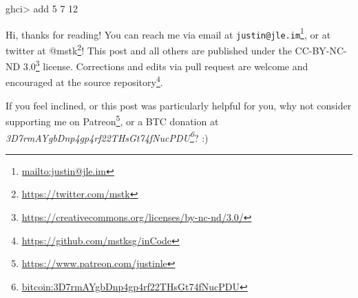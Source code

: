\documentclass[]{article}
\newenvironment{Shaded}{}{}
\newcommand{\DecValTok}[1]{\textcolor[rgb]{0.25,0.63,0.44}{#1}}
\newcommand{\FunctionTok}[1]{\textcolor[rgb]{0.02,0.16,0.49}{#1}}
\newcommand{\NormalTok}[1]{#1}
\renewcommand{\href}[2]{#2\footnote{\url{#1}}}
\begin{document}
\begin{Shaded}
\begin{Highlighting}[]
\NormalTok{ghci}\FunctionTok{>}\NormalTok{ add }\DecValTok{5} \DecValTok{7}
\DecValTok{12}
\end{Highlighting}
\end{Shaded}

Hi, thanks for reading! You can reach me via email at
\href{mailto:justin@jle.im}{\nolinkurl{justin@jle.im}}, or at twitter at
\href{https://twitter.com/mstk}{@mstk}! This post and all others are published
under the \href{https://creativecommons.org/licenses/by-nc-nd/3.0/}{CC-BY-NC-ND
3.0} license. Corrections and edits via pull request are welcome and encouraged
at \href{https://github.com/mstksg/inCode}{the source repository}.

If you feel inclined, or this post was particularly helpful for you, why not
consider \href{https://www.patreon.com/justinle}{supporting me on Patreon}, or a
BTC donation at
\emph{\href{bitcoin:3D7rmAYgbDnp4gp4rf22THsGt74fNucPDU}{3D7rmAYgbDnp4gp4rf22THsGt74fNucPDU}}?
:)
\end{document}
